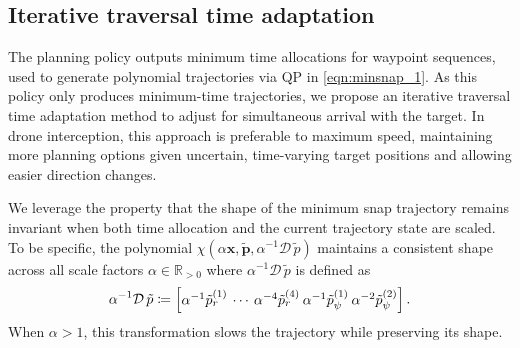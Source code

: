 \subsection{Iterative traversal time adaptation}


The planning policy outputs minimum time allocations for waypoint sequences, used to generate polynomial trajectories via QP in \eqref{eqn:minsnap_1}. 
As this policy only produces minimum-time trajectories, we propose an iterative traversal time adaptation method to adjust for simultaneous arrival with the target. 
In drone interception, this approach is preferable to maximum speed, maintaining more planning options given uncertain, time-varying target positions and allowing easier direction changes.

We leverage the property that the shape of the minimum snap trajectory remains invariant when both time allocation and the current trajectory state are scaled.
To be specific, the polynomial $\chi(\alpha \mathbf{x}, \tilde {\mathbf{p}}, \alpha^{-1}\mathcal{D\,} \tilde p)$ maintains a consistent shape across all scale factors $\alpha\in\mathbb{R}_{>0}$ where $\alpha^{-1}\mathcal{D\,} \tilde p$ is defined as
\begin{equation}
\alpha^{-1} \mathcal{D\,} \tilde p \coloneqq 
\begin{bmatrix}
\alpha^{-1} \tilde{p}_r^{(1)} \kern2pt \cdots \kern2pt \alpha^{-4} \tilde{p}_r^{(4)} \kern2pt \alpha^{-1} \tilde{p}_\psi^{(1)} \kern2pt \alpha^{-2} \tilde{p}_\psi^{(2)}
\end{bmatrix}.
\label{alg:scale_property}
\end{equation}
When $\alpha > 1$, this transformation slows the trajectory while preserving its shape.

